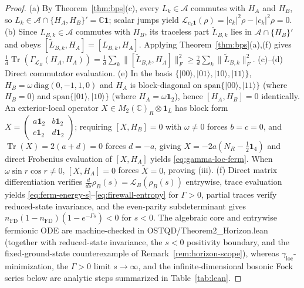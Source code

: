 \documentclass[11pt,a4paper]{article}
\theoremstyle{definition}
\theoremstyle{remark}
\newcommand{\Tr}{\operatorname{Tr}}
\newcommand{\cA}{\mathcal{A}}
\newcommand{\cL}{\mathcal{L}}
\newcommand{\bbC}{\mathbb{C}}
\newcommand{\1}{\mathbf{1}}
\newcommand{\normF}[1]{\|#1\|_F}
\newcommand{\code}[1]{{\footnotesize\ttfamily #1}}
\begin{document}
\begin{proof}
(a) By Theorem~\ref{thm:bps}(c), every $L_k \in \cA$ commutes with $H_A$ and $H_B$, so $L_k \in \cA \cap \{H_A,H_B\}' = \bbC\1$; scalar jumps yield $\cL_{c_k\1}(\rho) = |c_k|^2\rho - |c_k|^2\rho = 0$.
(b) Since $L_{B,k} \in \cA$ commutes with $H_B$, its traceless part $\tilde{L}_{B,k}$ lies in $\cA \cap \{H_B\}'$ and obeys $[\tilde{L}_{B,k}, H_A] = [L_{B,k}, H_A]$. Applying Theorem~\ref{thm:bps}(a),(f) gives $\frac{1}{d}\Tr(\Gamma_{\cL_B}(H_A,H_A)) = \frac{1}{d}\sum_k \normF{[\tilde{L}_{B,k},H_A]}^2 \ge \frac{\gamma}{d}\sum_k\normF{\tilde{L}_{B,k}}^2$.
(c)--(d) Direct commutator evaluation.
(e) In the basis $\{|00\rangle,|01\rangle,|10\rangle,|11\rangle\}$, $H_B = \omega\,\mathrm{diag}(0,-1,1,0)$ and $H_A$ is block-diagonal on $\mathrm{span}\{|00\rangle,|11\rangle\}$ (where $H_B = 0$) and $\mathrm{span}\{|01\rangle,|10\rangle\}$ (where $H_A = \omega\1_2$), hence $[H_A,H_B]=0$ identically. An exterior-local operator $X \in M_2(\bbC)_R\otimes\1_L$ has block form $X = \begin{pmatrix} a\1_2 & b\1_2 \\ c\1_2 & d\1_2 \end{pmatrix}$; requiring $[X,H_B]=0$ with $\omega\neq 0$ forces $b=c=0$, and $\Tr(X)=2(a+d)=0$ forces $d=-a$, giving $X = -2a(N_R - \frac{1}{2}\1_4)$ and direct Frobenius evaluation of $[X,H_A]$ yields \eqref{eq:gamma-loc-ferm}. When $\omega\sin r\cos r \neq 0$, $[X,H_A]=0$ forces $\tilde{X}=0$, proving (iii).
(f) Direct matrix differentiation verifies $\frac{d}{ds}\rho_B(s) = \cL_B(\rho_B(s))$ entrywise, trace evaluation yields \eqref{eq:ferm-energy-s}--\eqref{eq:firewall-entropy} for $\Gamma > 0$, partial traces verify reduced-state invariance, and the even-parity subdeterminant gives $n_{\mathrm{FD}}(1-n_{\mathrm{FD}})(1-e^{-\Gamma s})<0$ for $s<0$. The algebraic core and entrywise fermionic ODE are machine-checked in \code{OSTQD/Theorem2\_Horizon.lean} (together with reduced-state invariance, the $s<0$ positivity boundary, and the fixed-ground-state counterexample of Remark~\ref{rem:horizon-scope}), whereas $\gamma_{\mathrm{loc}}$-minimization, the $\Gamma>0$ limit $s\to\infty$, and the infinite-dimensional bosonic Fock series below are analytic steps summarized in Table~\ref{tab:lean}.
\end{proof}
\end{document}
